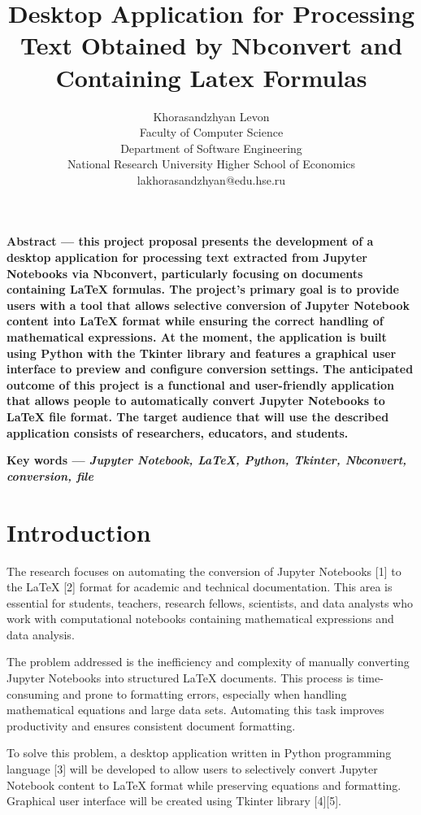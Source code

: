\documentclass{article}
\title{\textbf{Desktop Application for Processing 
Text Obtained by Nbconvert and Containing Latex Formulas}}
\author{Khorasandzhyan Levon\\Faculty of Computer Science\\Department of Software Engineering\\National Research University Higher School of Economics\\lakhorasandzhyan@edu.hse.ru}
\begin{document}
\date{}
\maketitle

\begin{multicols}{2}

\textbf{
Abstract — this project proposal presents the development of a desktop application for processing text extracted from Jupyter Notebooks via Nbconvert, particularly focusing on documents containing LaTeX formulas. The project's primary goal is to provide users with a tool that allows selective conversion of Jupyter Notebook content into LaTeX format while ensuring the correct handling of mathematical expressions. At the moment, the application is built using Python with the Tkinter library and features a graphical user interface to preview and configure conversion settings. The anticipated outcome of this project is a functional and user-friendly application that allows people to automatically convert Jupyter Notebooks to LaTeX file format. The target audience that will use the described application consists of researchers, educators, and students.
}

\textbf{Key words — \textit{Jupyter Notebook, LaTeX, Python, Tkinter, Nbconvert, conversion, file}}

\section{Introduction}
The research focuses on automating the conversion of Jupyter Notebooks [1] to the LaTeX [2] format for academic and technical documentation. This area is essential for students, teachers, research fellows, scientists, and data analysts who work with computational notebooks containing mathematical expressions and data analysis.

The problem addressed is the inefficiency and complexity of manually converting Jupyter Notebooks into structured LaTeX documents. This process is time-consuming and prone to formatting errors, especially when handling mathematical equations and large data sets. Automating this task improves productivity and ensures consistent document formatting.

To solve this problem, a desktop application written in Python programming language [3] will be developed to allow users to selectively convert Jupyter Notebook content to LaTeX format while preserving equations and formatting. Graphical user interface will be created using Tkinter library [4][5].


\end{multicols}
\end{document}
